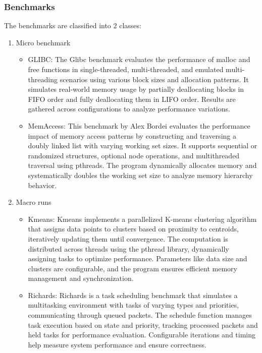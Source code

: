 \documentclass[11pt]{article}
\begin{document}
\subsubsection{Benchmarks}
\label{sec:orgf614dbb}
The benchmarks\cite{Benchmark} are classified into 2 classes:

\begin{enumerate}
\item Micro benchmark
\label{sec:org41c278c}
\begin{itemize}
\item GLIBC: The Glibc benchmark evaluates the performance of
malloc and free functions in single-threaded, multi-threaded,
and emulated multi-threading scenarios using various block sizes and
allocation patterns. It simulates real-world memory usage by partially
deallocating blocks in FIFO order and fully deallocating them in LIFO order.
Results are gathered across configurations to analyze performance variations.
\item MemAccess: This benchmark by Alex Bordei evaluates the performance impact of
memory access patterns by constructing and traversing a doubly
linked list with varying working set sizes. It supports sequential or
randomized structures, optional node operations, and multithreaded
traversal using pthreads. The program dynamically allocates memory and systematically
doubles the working set size to analyze memory hierarchy behavior.
\end{itemize}

\item Macro runs
\label{sec:org89020f2}
\begin{itemize}
\item Kmeans: Kmeans implements a parallelized K-means clustering algorithm that
assigns data points to clusters based on proximity to centroids,
iteratively updating them until convergence. The computation is
distributed across threads using the pthread library, dynamically
assigning tasks to optimize performance. Parameters like data size
and clusters are configurable, and the program ensures efficient
memory management and synchronization.
\item Richards: Richards is a task scheduling benchmark that simulates a
multitasking environment with tasks of varying types and priorities,
communicating through queued packets. The schedule function manages
task execution based on state and priority, tracking processed packets
and held tasks for performance evaluation. Configurable iterations and
timing help measure system performance and ensure correctness.
\end{itemize}
\end{enumerate}
\end{document}
